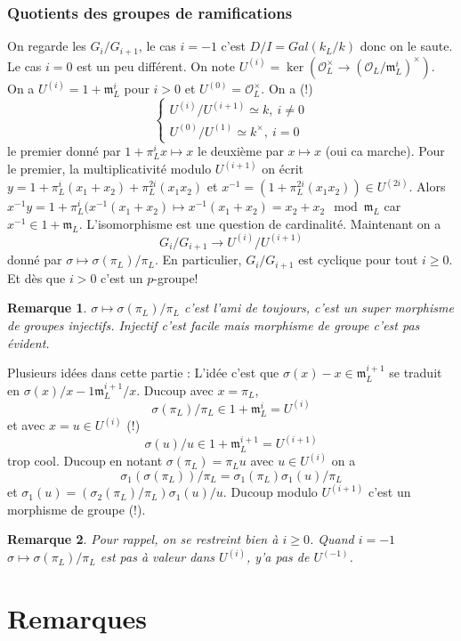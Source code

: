 \documentclass[a4paper,12pt]{book}
\newcommand{\Or}{\mathcal{O}}
\newcommand{\m}{\mathfrak m}
\theoremstyle{plain}
\newtheorem{rem}{Remarque}
\theoremstyle{definition}
\theoremstyle{remark}
\begin{document}
\subsection{Quotients des groupes de ramifications}
On regarde les $G_i/G_{i+1}$, le cas $i=-1$ c'est $D/I=Gal(k_L/k)$
donc on le saute. Le cas $i=0$ est un peu différent. On note
$U^{(i)}=\ker(\Or_L^\times\to (\Or_L/\m_L^i)^\times)$. On a
$U^{(i)}=1+\m_L^i$ pour $i>0$ et $U^{(0)}=\Or_L^\times$. On a (!)
\[\begin{cases}
    U^{(i)}/U^{(i+1)}\simeq k,~i\ne 0\\
    U^{(0)}/U^{(1)}\simeq k^\times,~i=0
\end{cases}\]
le premier donné par $1+\pi_L^ix\mapsto x$ le deuxième par
$x\mapsto x$ (oui ca marche). Pour le premier, la multiplicativité
modulo $U^{(i+1)}$ on écrit 
$y=1+\pi_L^i(x_1+x_2)+\pi_L^{2i}(x_1x_2)$ et 
$x^{-1}=(1+\pi_L^{2i}(x_1x_2))\in U^{(2i)}$. Alors $x^{-1}y=1+
\pi_L^i(x^{-1}(x_1+x_2)\mapsto x^{-1}(x_1+x_2)=x_2+x_2\mod\m_L$
car $x^{-1}\in 1+\m_L$. L'isomorphisme est une question
de cardinalité. Maintenant on a 
\[G_{i}/G_{i+1}\to U^{(i)}/U^{(i+1)}\]
donné par $\sigma \mapsto \sigma(\pi_L)/\pi_L$. En particulier,
$G_{i}/G_{i+1}$ est cyclique pour tout $i\geq 0$. Et dès que
$i>0$ c'est un $p$-groupe! 
\begin{rem}
    $\sigma\mapsto \sigma(\pi_L)/\pi_L$ c'est l'ami de toujours,
    c'est un super morphisme de groupes injectifs. Injectif c'est
    facile mais morphisme de groupe c'est pas évident.
\end{rem}
Plusieurs idées dans cette partie : L'idée c'est que 
$\sigma(x)-x\in \m_L^{i+1}$ se traduit en 
$\sigma(x)/x-1\m_L^{i+1}/x$. Ducoup avec $x=\pi_L$, 
\[\sigma(\pi_L)/\pi_L\in 1+\m_L^i=U^{(i)}\]
et avec $x=u\in U^{(i)}$ (!)
\[\sigma(u)/u\in 1+\m_L^{i+1}=U^{(i+1)}\]
trop cool. Ducoup en notant $\sigma(\pi_L)=\pi_Lu$ avec 
$u\in U^{(i)}$ on a 
\[\sigma_1(\sigma(\pi_L))/\pi_L=\sigma_1(\pi_L)\sigma_1(u)/\pi_L\]
et $\sigma_1(u)=(\sigma_2(\pi_L)/\pi_L)\sigma_1(u)/u$. Ducoup 
modulo $U^{(i+1)}$ c'est un morphisme de groupe (!).

\begin{rem}
    Pour rappel, on se restreint bien à $i\geq 0$. Quand $i=-1$
    $\sigma\mapsto \sigma(\pi_L)/\pi_L$ est pas à valeur dans
    $U^{(i)}$, y'a pas de $U^{(-1)}$.
\end{rem}

\chapter{Remarques}
\end{document}
